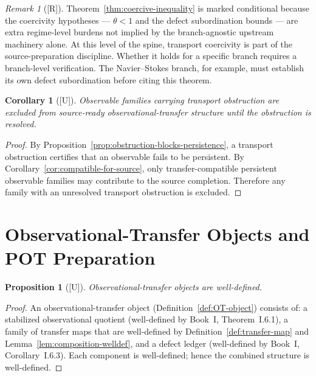\documentclass[12pt,oneside]{amsbook}
\theoremstyle{plain}
\newtheorem{proposition}[theorem]{Proposition}
\newtheorem{corollary}[theorem]{Corollary}
\theoremstyle{definition}
\theoremstyle{remark}
\newtheorem{remark}[theorem]{Remark}
\newcommand{\status}[1]{\textup{[#1]}}
\begin{document}
\begin{remark}[\status{R}]\label{rmk:coercive-conditional}
Theorem~\ref{thm:coercive-inequality} is marked conditional because
the coercivity hypotheses --- $\theta < 1$ and the defect subordination
bounds --- are extra regime-level burdens not implied by the
branch-agnostic upstream machinery alone.  At this level of the spine,
transport coercivity is part of the source-preparation discipline.
Whether it holds for a specific branch requires a branch-level
verification.  The Navier--Stokes branch, for example, must establish
its own defect subordination before citing this theorem.
\end{remark}

\begin{corollary}[\status{U}]\label{cor:obstruction-blocks-source}
Observable families carrying transport obstruction are excluded from
source-ready observational-transfer structure until the obstruction is
resolved.
\end{corollary}

\begin{proof}
By Proposition~\ref{prop:obstruction-blocks-persistence}, a transport
obstruction certifies that an observable fails to be persistent.  By
Corollary~\ref{cor:compatible-for-source}, only transfer-compatible
persistent observable families may contribute to the source completion.
Therefore any family with an unresolved transport obstruction is
excluded.
\end{proof}

\section{Observational-Transfer Objects and POT Preparation}

\begin{proposition}[\status{U}]\label{prop:OT-welldef}
Observational-transfer objects are well-defined.
\end{proposition}

\begin{proof}
An observational-transfer object
(Definition~\ref{def:OT-object}) consists of: a stabilized
observational quotient (well-defined by Book~I, Theorem~I.6.1), a
family of transfer maps that are well-defined by
Definition~\ref{def:transfer-map} and Lemma~\ref{lem:composition-welldef},
and a defect ledger (well-defined by Book~I,
Corollary~I.6.3).  Each component is well-defined; hence the combined
structure is well-defined.
\end{proof}
\end{document}
